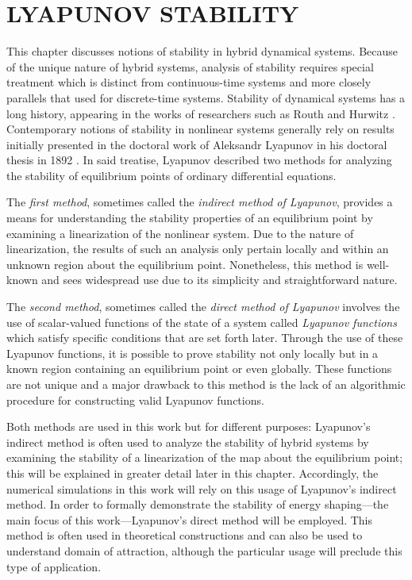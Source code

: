 \chapter{\uppercase{Lyapunov Stability}}

This chapter discusses notions of stability in hybrid dynamical systems.
%
Because of the unique nature of hybrid systems, analysis of stability requires
special treatment which is distinct from continuous-time systems and more
closely parallels that used for discrete-time systems.
%
Stability of dynamical systems has a long history, appearing in the works of
researchers such as Routh \cite{Routh1877} and Hurwitz \cite{Hurwitz1895}.
%
Contemporary notions of stability in nonlinear systems generally rely on results
initially presented in the doctoral work of Aleksandr Lyapunov in his doctoral
thesis in 1892 \cite{Lyapunov1992}.
%
In said treatise, Lyapunov described two methods for analyzing the stability of
equilibrium points of ordinary differential equations.

The {\em first method}, sometimes called the {\em indirect method of Lyapunov},
provides a means for understanding the stability properties of an equilibrium
point by examining a linearization of the nonlinear system.
%
Due to the nature of linearization, the results of such an analysis only pertain
locally and within an unknown region about the equilibrium point.
%
Nonetheless, this method is well-known and sees widespread use due to its
simplicity and straightforward nature.
%

The {\em second method}, sometimes called the {\em direct method of Lyapunov}
involves the use of scalar-valued functions of the state of a system called {\em
  Lyapunov functions} which satisfy specific conditions that are set forth
later.
%
Through the use of these Lyapunov functions, it is possible to prove
stability not only locally but in a known region containing an equilibrium point
or even globally.
%
These functions are not unique and a major drawback to this method is the lack
of an algorithmic procedure for constructing valid Lyapunov functions.

Both methods are used in this work but for different purposes:
%
Lyapunov's indirect method is often used to analyze the stability of hybrid
systems by examining the stability of a linearization of the \Poincare{} map
about the equilibrium point; this will be explained in greater detail later in
this chapter.
%
Accordingly, the numerical simulations in this work will rely on this usage of
Lyapunov's indirect method.
%
In order to formally demonstrate the stability of energy shaping---the main
focus of this work---Lyapunov's direct method will be employed.
%
This method is often used in theoretical constructions and can also be used to
understand domain of attraction, although the particular usage will preclude
this type of application.

